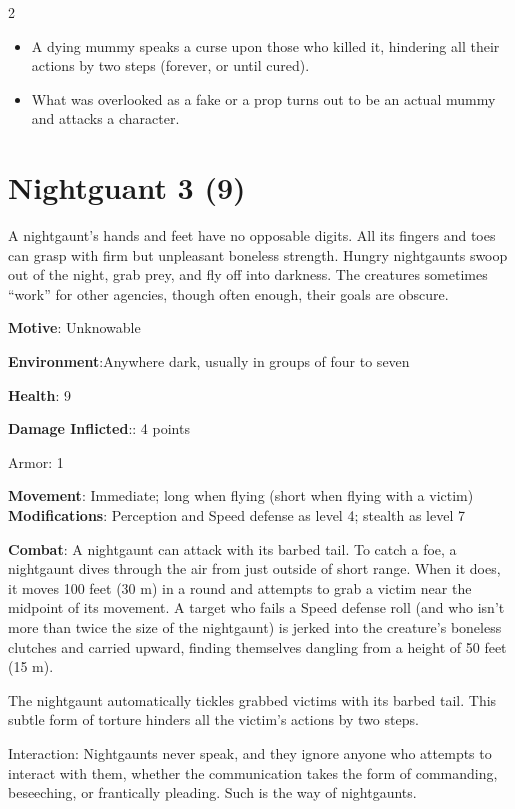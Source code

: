 \begin{multicols}{2}
\begin{itemize}
\item A dying mummy speaks a curse upon those who killed it, hindering all their actions by two steps (forever, or until cured).

\item What was overlooked as a fake or a prop turns out to be an actual mummy and attacks a character.
\end{itemize}

\section{Nightguant 3 (9)}

A nightgaunt’s hands and feet have no opposable digits. All its fingers and toes can grasp with firm but unpleasant boneless strength. Hungry nightgaunts swoop out of the night, grab prey, and fly off into darkness. The creatures sometimes “work” for other agencies, though often enough, their goals are obscure.

\textbf{Motive}: Unknowable

\textbf{Environment}:Anywhere dark, usually in groups of four to seven

\textbf{Health}: 9

\textbf{Damage Inflicted}:: 4 points

Armor: 1

\textbf{Movement}: Immediate; long when flying (short when flying with a victim) \textbf{Modifications}: Perception and Speed defense as level 4; stealth
as level 7

\textbf{Combat}: A nightgaunt can attack with its barbed tail. To catch a foe, a nightgaunt dives through the air from just outside of short range. When it does, it moves 100 feet (30 m) in a round and attempts to grab a victim near the midpoint of its movement. A target who fails a Speed defense roll (and who isn’t more than twice the size of the nightgaunt) is jerked into the creature’s boneless clutches and carried upward, finding themselves dangling from a height of 50 feet (15 m).

The nightgaunt automatically tickles grabbed victims with its barbed tail. This subtle form of torture hinders all the victim’s actions by two steps.

Interaction: Nightgaunts never speak, and they ignore anyone who attempts to interact with them, whether the communication takes the form of commanding, beseeching, or frantically pleading. Such is the way of nightgaunts.


\end{multicols}

